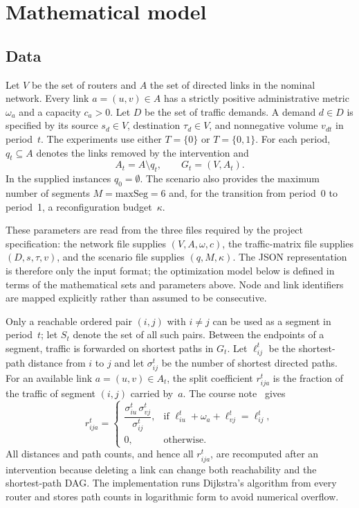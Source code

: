 \section{Mathematical model}
\label{sec:model}

\subsection{Data}
\label{sec:data}

Let $V$ be the set of routers and $A$ the set of directed links in the nominal network. Every link
$a=(u,v)\in A$ has a strictly positive administrative metric $\omega_a$ and a capacity $c_a>0$. Let
$D$ be the set of traffic demands. A demand $d\in D$ is specified by its source $s_d\in V$,
destination $\tau_d\in V$, and nonnegative volume $v_{dt}$ in period~$t$. The experiments use either
$T=\{0\}$ or $T=\{0,1\}$. For each period, $q_t\subseteq A$ denotes the links removed by the
intervention and
\[
A_t=A\setminus q_t,\qquad G_t=(V,A_t).
\]
In the supplied instances $q_0=\emptyset$. The scenario also provides the maximum number of segments
$M=\mathrm{maxSeg}=6$ and, for the transition from period~0 to period~1, a reconfiguration
budget~$\kappa$.

These parameters are read from the three files required by the project specification: the network
file supplies $(V,A,\omega,c)$, the traffic-matrix file supplies $(D,s,\tau,v)$, and the scenario
file supplies $(q,M,\kappa)$. The JSON representation is therefore only the input format; the
optimization model below is defined in terms of the mathematical sets and parameters above. Node and
link identifiers are mapped explicitly rather than assumed to be consecutive.

Only a reachable ordered pair $(i,j)$ with $i\neq j$ can be used as a segment in period~$t$; let
$S_t$ denote the set of all such pairs. Between the endpoints of a segment, traffic is forwarded on
shortest paths in $G_t$. Let $\ell^t_{ij}$ be the shortest-path distance from $i$ to $j$ and let
$\sigma^t_{ij}$ be the number of shortest directed paths. For an available link $a=(u,v)\in A_t$, the
split coefficient $r^t_{ija}$ is the fraction of the traffic of segment $(i,j)$ carried by~$a$. The
course note~\citep{courser2026} gives
\begin{equation}
r^t_{ija}=
\begin{cases}
\dfrac{\sigma^t_{iu}\,\sigma^t_{vj}}{\sigma^t_{ij}}, & \text{if } \ell^t_{iu}+\omega_a+\ell^t_{vj}=\ell^t_{ij},\\[0.6em]
0, & \text{otherwise.}
\end{cases}
\label{eq:r}
\end{equation}
All distances and path counts, and hence all $r^t_{ija}$, are recomputed after an intervention
because deleting a link can change both reachability and the shortest-path DAG. The implementation
runs Dijkstra's algorithm from every router and stores path counts in logarithmic form to avoid
numerical overflow.

